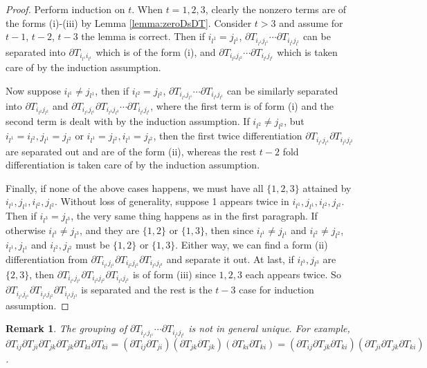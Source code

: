 \documentclass[10pt]{article}
\newtheorem{remark}{Remark}
\begin{document}
\begin{proof}
	Perform induction on $t$.
	When $t=1,2,3$, clearly the nonzero terms are of the forms (i)-(iii) by Lemma \ref{lemma:zeroDsDT}.
	Consider $t>3$ and assume for $t-1$, $t-2$, $t-3$ the lemma is correct.
	Then if $i_{l^1}=j_{l^1}$, $\partial T_{i_{l^1}j_{l^1}} \cdots \partial T_{i_{l^t}j_{l^t}}$ can be separated into $\partial T_{i_{l^1}i_{l^1}}$ which is of the form (i), and $\partial T_{i_{l^2}j_{l^2}} \cdots \partial T_{i_{l^t}j_{l^t}}$ which is taken care of by the induction assumption.
	
	Now suppose $i_{l^1} \neq j_{l^1}$, then if $i_{l^2} = j_{l^2}$, $\partial T_{i_{l^1}j_{l^1}} \cdots \partial T_{i_{l^t}j_{l^t}}$ can be similarly separated into $\partial T_{i_{l^2}j_{l^2}}$ and $\partial T_{i_{l^1}j_{l^1}} \partial T_{i_{l^3}j_{l^3}} \cdots \partial T_{i_{l^t}j_{l^t}}$, where the first term is of form (i) and the second term is dealt with by the induction assumption.
	If $i_{l^2} \neq j_{l^2}$, but $i_{l^1}=i_{l^2}, j_{l^1}=j_{l^2}$ or $i_{l^1}=j_{l^2}, i_{l^1}=j_{l^2}$, then the first twice differentiation $\partial T_{i_{l^1}j_{l^1}} \partial T_{i_{l^2}j_{l^2}}$ are separated out and are of the form (ii), whereas the rest $t-2$ fold differentiation is taken care of by the induction assumption.
	
	Finally, if none of the above cases happens, we must have all $\{1,2,3\}$ attained by $i_{l^1},j_{l^1},i_{l^2},j_{l^2}$.
	Without loss of generality, suppose 1 appears twice in $i_{l^1},j_{l^1},i_{l^2},j_{l^2}$.
	Then if $i_{l^3}=j_{l^3}$, the very same thing happens as in the first paragraph.
	If otherwise $i_{l^3} \neq j_{l^3}$, and they are $\{1,2\}$ or $\{1,3\}$, then since $i_{l^1} \neq j_{l^1}$ and $i_{l^2} \neq j_{l^2}$, $i_{l^1},j_{l^1}$ and $i_{l^2},j_{l^2}$ must be $\{1,2\}$ or $\{1,3\}$.
	Either way, we can find a form (ii) differentiation from $\partial T_{i_{l^1}j_{l^1}} \partial T_{i_{l^2}j_{l^2}} \partial T_{i_{l^3}j_{l^3}}$ and separate it out.
	At last, if $i_{l^3},j_{l^3}$ are $\{2,3\}$, then $\partial T_{i_{l^1}j_{l^1}} \partial T_{i_{l^2}j_{l^2}} \partial T_{i_{l^3}j_{l^3}}$ is of form (iii) since $1,2,3$ each appears twice.
	So $\partial T_{i_{l^1}j_{l^1}} \partial T_{i_{l^2}j_{l^2}} \partial T_{i_{l^3}j_{l^3}}$ is separated and the rest is the $t-3$ case for induction assumption.
\end{proof}

\begin{remark}
	The grouping of $\partial T_{i_{l^1}j_{l^1}} \cdots \partial T_{i_{l^t}j_{l^t}}$ is not in general unique. For example, $\partial T_{ij} \partial T_{ji} \partial T_{jk} \partial T_{jk} \partial T_{ki} \partial T_{ki} = (\partial T_{ij} \partial T_{ji}) (\partial T_{jk} \partial T_{jk}) (\partial T_{ki} \partial T_{ki}) = (\partial T_{ij} \partial T_{jk} \partial T_{ki}) (\partial T_{ji} \partial T_{jk} \partial T_{ki})$.
\end{remark}
\end{document}
